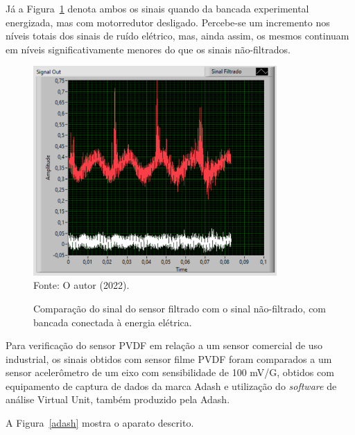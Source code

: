 \documentclass[
	12pt,				
	oneside,			
	a4paper,			
	english,			
	brazil,			
	]{abntex2ppgsi}
\begin{document}
Já a Figura~\ref{sinal_filtrado_maquina_ligada_tomada} denota ambos os sinais quando da bancada experimental energizada, mas com motorredutor desligado. Percebe-se um incremento nos níveis totais dos sinais de ruído elétrico, mas, ainda assim, os mesmos continuam em níveis significativamente menores do que os sinais não-filtrados.

\begin{figure}[H]
\centering
\caption {Comparação do sinal do sensor filtrado com o sinal não-filtrado, com bancada conectada à energia elétrica.}
\includegraphics[width=\textwidth,height=80mm,keepaspectratio]{GraficosAnalise/sinal_filtrado_maquina_ligada_tomada} \\
Fonte: O autor (2022).
\label{sinal_filtrado_maquina_ligada_tomada}
\end{figure} 


Para verificação do sensor PVDF em relação a um sensor comercial de uso industrial, os sinais obtidos com sensor filme PVDF foram comparados a um sensor acelerômetro de um eixo com sensibilidade de 100 mV/G, obtidos com equipamento de captura de dados da marca Adash e utilização do \textit{software} de análise Virtual Unit, também produzido pela Adash. 

A Figura~\ref{adash} mostra o aparato descrito.
\end{document}
